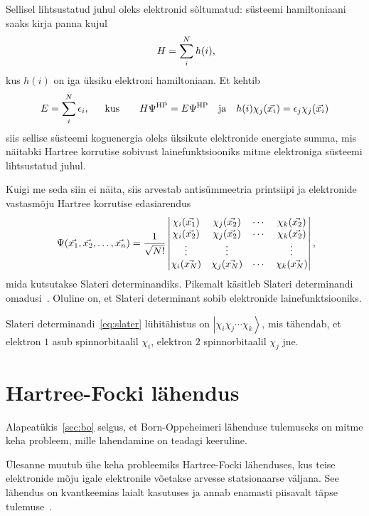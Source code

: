 \documentclass[12pt]{report}
\def\ket#1{\left|#1\right>}
\begin{document}
Sellisel lihtsustatud juhul oleks elektronid sõltumatud: süsteemi hamiltoniaani saaks kirja panna kujul
\begin{align}
    H = \sum_i^N h(i) \rlap{,}
\end{align}
kus \(h(i)\) on iga üksiku elektroni hamiltoniaan.
Et kehtib
\begin{align}
    E = \sum_i^N \epsilon_i \rlap{,}
    \qquad \text{kus} \qquad
    H \Psi^\text{HP} = E \Psi^\text{HP}
    \quad \text{ja} \quad
    h(i) \chi_j(\vec{x_i}) = \epsilon_j \chi_j(\vec{x_i})
\end{align}
siis sellise süsteemi koguenergia oleks üksikute elektronide energiate summa, mis näitabki Hartree korrutise sobivust lainefunktsiooniks mitme elektroniga süsteemi lihtsustatud juhul.

Kuigi me seda siin ei näita, siis arvestab antisümmeetria printsiipi ja elektronide vastasmõju Hartree korrutise edasiarendus
\begin{align}\label{eq:slater}
    \Psi(\vec{x_1}, \vec{x_2}, \ldots, \vec{x_n})
    = \frac{1}{\sqrt{N!}} \begin{vmatrix}
        \chi_i(\vec{x_1}) & \chi_j(\vec{x_2}) & \cdots & \chi_k(\vec{x_2}) \\
        \chi_i(\vec{x_2}) & \chi_j(\vec{x_2}) & \cdots & \chi_k(\vec{x_2}) \\
        \vdots & \vdots & & \vdots \\
        \chi_i(\vec{x_N}) & \chi_j(\vec{x_N}) & \cdots & \chi_k(\vec{x_N}) \\
    \end{vmatrix} \rlap{,}
\end{align}
mida kutsutakse Slateri determinandiks.
Pikemalt käsitleb Slateri determinandi omadusi~\cite{szabo+ostlund}.
Oluline on, et Slateri determinant sobib elektronide lainefunktsiooniks.

Slateri determinandi~\eqref{eq:slater} lühitähistus on \(\ket{\chi_i\chi_j\cdots\chi_k}\), mis tähendab, et elektron \(1\) asub spinnorbitaalil \(\chi_i\), elektron \(2\) spinnorbitaalil \(\chi_j\) jne.

\section{Hartree-Focki lähendus}\label{sec:hf}

Alapeatükis~\ref{sec:bo} selgus, et Born-Oppeheimeri lähenduse tulemuseks on mitme keha probleem, mille lahendamine on teadagi keeruline.

Ülesanne muutub ühe keha probleemiks Hartree-Focki lähenduses, kus teise elektronide mõju igale elektronile võetakse arvesse statsionaarse väljana.
See lähendus on kvantkeemias laialt kasutuses ja annab enamasti piisavalt täpse tulemuse~\cite{szabo+ostlund}.
\end{document}
